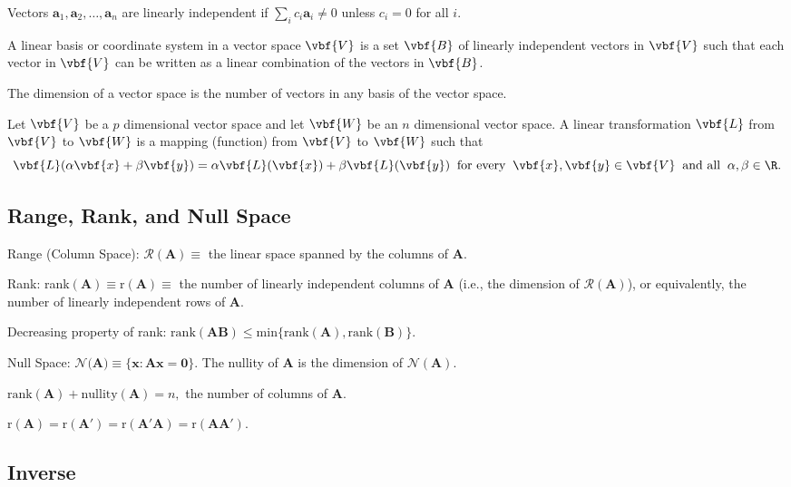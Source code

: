 \bdefi
Vectors $\mathbf{a}_1, \mathbf{a}_2, \ldots,\mathbf{a}_n$ are linearly
independent if $\sum_i c_i \mathbf a_i \neq 0$ unless $c_i=0$ for all
$i$.
\esdefi

\bsdefi
A linear basis or coordinate system in a vector space $\vbf{V}$ is a
set $\vbf{B}$ of linearly independent vectors in $\vbf{V}$ such that
each vector in $\vbf{V}$ can be written as a linear combination of the
vectors in $\vbf{B}$.
\esdefi

\bsdefi
The dimension of a vector space is the number of vectors in any basis
of the vector space.
\esdefi

\bsdefi
Let $\vbf{V}$ be a $p$ dimensional vector space and let $\vbf{W}$ be
an $n$ dimensional vector space.  A linear transformation $\vbf{L}$
from $\vbf{V}$ to $\vbf{W}$ is a mapping (function) from $\vbf{V}$ to
$\vbf{W}$ such that
$$\vbf{L}(\alpha\vbf{x}+\beta\vbf{y})
=\alpha\vbf{L}(\vbf{x})+\beta\vbf{L}(\vbf{y})\;\;\mbox{for every}\;\;
\vbf{x},\vbf{y} \in \vbf{V}\;\;\mbox{and all}\;\;\alpha, \beta \in
\R.$$
\edefi


\subsection{Range, Rank, and Null Space}

\bdefi
Range (Column Space): $\mathcal R(\mathbf A) \equiv$ the linear space
spanned by the columns of $\mathbf A$.
\esdefi

\bsdefi
Rank: rank$(\mathbf A)\equiv \mathrm{r}(\mathbf A)\equiv$ the number
of linearly independent columns of $\mathbf A$ (i.e., the dimension of
$\mathcal R(\mathbf A)$), or equivalently, the number of linearly
independent rows of $\mathbf A$.
\esdefi

\btheo
Decreasing property of rank: $\mathbf{ \mathrm{rank}(AB) \leq
\mathrm{min}\{\mathrm{rank}(A), \mathrm{rank}(B)\}}.$
\estheo

\bdefi
Null Space: $\mathcal{N}(\mathbf{A)\equiv\{x: Ax=0}\}$.  The nullity
of $\mathbf A$ is the dimension of $\mathcal{N}(\mathbf{A})$.
\esdefi

\btheo
$\mathrm{rank}(\mathbf{A}) + \mathrm{nullity}(\mathbf{A}) = n,$ the
number of columns of $\mathbf A$.
\estheo

\bstheo
$\mathbf{\mathrm{r}(A) = \mathrm{r}(A') = \mathrm{r}(A'A) =
\mathrm{r}(AA')}$.
\etheo


\subsection{Inverse}

